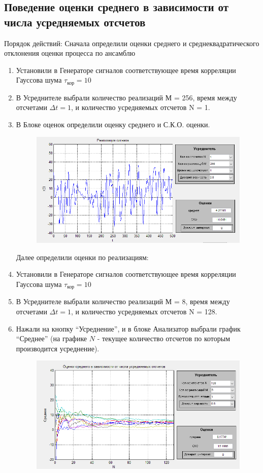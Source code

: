 \subsection[Задание 2]{Поведение оценки среднего в зависимости от числа усредняемых отсчетов}
Порядок действий:
Сначала определили оценки среднего и среднеквадратического отклонения оценки процесса по ансамблю
\begin{enumerate}
	\item Установили в Генераторе сигналов соответствующее время корреляции Гауссова шума $\tau_\text{кор} = 10$
	\item В Усреднителе выбрали количество реализаций М = 256, время между отсчетами $\Delta t = 1$, и количество усредняемых отсчетов N = 1.
	\item 	В Блоке оценок определили оценку среднего и С.К.О. оценки.	
	\begin{figure}[H]
		\centering
        \includegraphics[width=\linewidth]{fig/fig21}
	\end{figure}

	Далее определили оценки по реализациям:
	\item Установили в Генераторе сигналов соответствующее время корреляции Гауссова шума $\tau_\text{кор} = 10$
	\item В Усреднителе выбрали количество реализаций М = 8, время между отсчетами $\Delta t = 1$, и количество усредняемых отсчетов N = 128.
	\item Нажали на кнопку “Усреднение”, и в блоке Анализатор выбрали график “Среднее” (на графике $N$ - текущее количество отсчетов по которым производится усреднение).
	\begin{figure}[H]
		\centering
        \includegraphics[width=\linewidth]{fig/fig22}
	\end{figure}


\end{enumerate}
